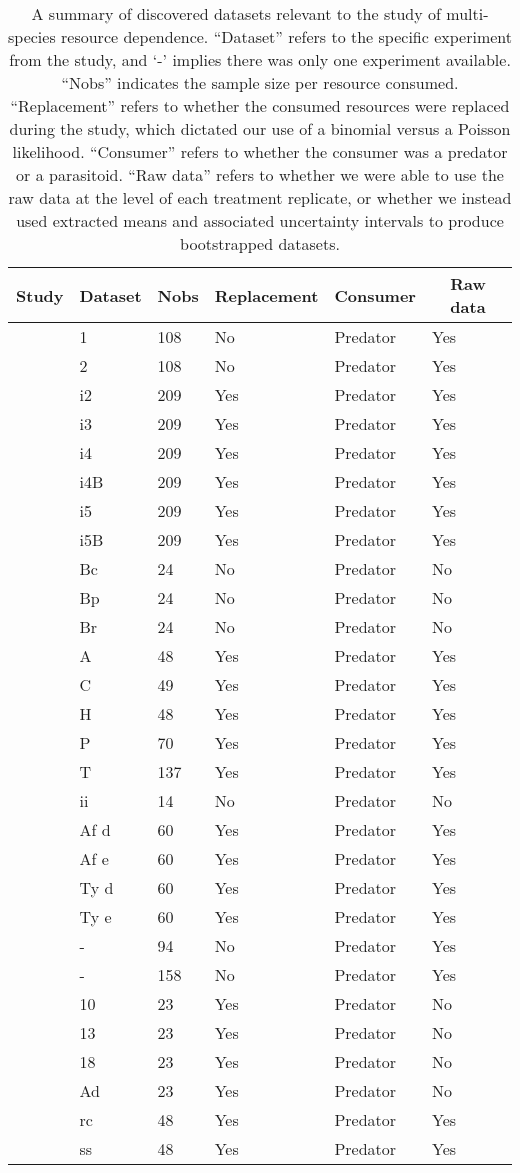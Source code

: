 \begin{table}[!tbp]
\caption{
      A summary of discovered datasets relevant to the study of multi-species resource dependence.
      ``Dataset'' refers to the specific experiment from the study, and `-' implies there was only one experiment available.
      ``Nobs'' indicates the sample size per resource consumed.
      ``Replacement'' refers to whether the consumed resources were replaced during the study, which dictated our use of a binomial versus a Poisson likelihood.
      ``Consumer'' refers to whether the consumer was a predator or a parasitoid.
      ``Raw data'' refers to whether we were able to use the raw data at the level of each treatment replicate, or whether we instead used extracted means and associated uncertainty intervals to produce bootstrapped datasets.
    \label{table:1pred2preydatasets}} 
\begin{center}
\begin{tabular}{llllll}
\hline\hline
\multicolumn{1}{c}{Study}&\multicolumn{1}{c}{Dataset}&\multicolumn{1}{c}{Nobs}&\multicolumn{1}{c}{Replacement}&\multicolumn{1}{c}{Consumer}&\multicolumn{1}{c}{Raw data}\tabularnewline
\hline
\citet{Colton:1987aa}&1&108&No&Predator&Yes\tabularnewline
\citet{Colton:1987aa}&2&108&No&Predator&Yes\tabularnewline
\citet{Elliott:2006aa}&i2&209&Yes&Predator&Yes\tabularnewline
\citet{Elliott:2006aa}&i3&209&Yes&Predator&Yes\tabularnewline
\citet{Elliott:2006aa}&i4&209&Yes&Predator&Yes\tabularnewline
\citet{Elliott:2006aa}&i4B&209&Yes&Predator&Yes\tabularnewline
\citet{Elliott:2006aa}&i5&209&Yes&Predator&Yes\tabularnewline
\citet{Elliott:2006aa}&i5B&209&Yes&Predator&Yes\tabularnewline
\citet{Iyer:1996aa}&Bc&24&No&Predator&No\tabularnewline
\citet{Iyer:1996aa}&Bp&24&No&Predator&No\tabularnewline
\citet{Iyer:1996aa}&Br&24&No&Predator&No\tabularnewline
\citet{Kalinkat:2011bd}&A&48&Yes&Predator&Yes\tabularnewline
\citet{Kalinkat:2011bd}&C&49&Yes&Predator&Yes\tabularnewline
\citet{Kalinkat:2011bd}&H&48&Yes&Predator&Yes\tabularnewline
\citet{Kalinkat:2011bd}&P&70&Yes&Predator&Yes\tabularnewline
\citet{Kalinkat:2011bd}&T&137&Yes&Predator&Yes\tabularnewline
\citet{Krylov:1992aa}&ii&14&No&Predator&No\tabularnewline
\citet{Lester:2002aa}&Af d&60&Yes&Predator&Yes\tabularnewline
\citet{Lester:2002aa}&Af e&60&Yes&Predator&Yes\tabularnewline
\citet{Lester:2002aa}&Ty d&60&Yes&Predator&Yes\tabularnewline
\citet{Lester:2002aa}&Ty e&60&Yes&Predator&Yes\tabularnewline
\citet{Long:2012ab}&-&94&No&Predator&Yes\tabularnewline
\citet{Nachappa:2006aa}&-&158&No&Predator&Yes\tabularnewline
\citet{Ranta:1985aa}&10&23&Yes&Predator&No\tabularnewline
\citet{Ranta:1985aa}&13&23&Yes&Predator&No\tabularnewline
\citet{Ranta:1985aa}&18&23&Yes&Predator&No\tabularnewline
\citet{Ranta:1985aa}&Ad&23&Yes&Predator&No\tabularnewline
\citet{Wong:2005aa}&rc&48&Yes&Predator&Yes\tabularnewline
\citet{Wong:2005aa}&ss&48&Yes&Predator&Yes\tabularnewline
\hline
\end{tabular}\end{center}
\end{table}
